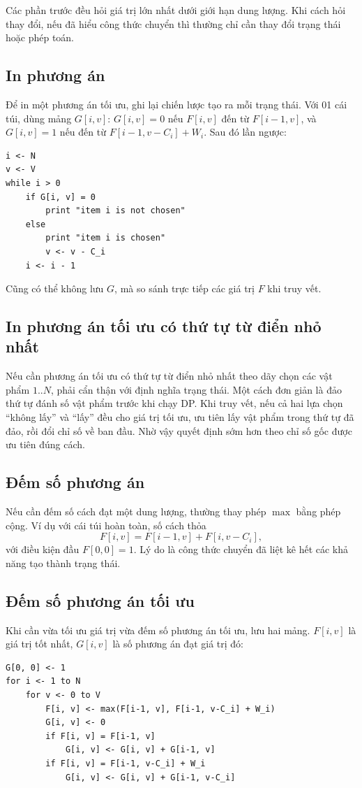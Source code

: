 \documentclass[11pt]{article}
\begin{document}
Các phần trước đều hỏi giá trị lớn nhất dưới giới hạn dung lượng. Khi cách hỏi
thay đổi, nếu đã hiểu công thức chuyển thì thường chỉ cần thay đổi trạng thái
hoặc phép toán.

\subsection{In phương án}

Để in một phương án tối ưu, ghi lại chiến lược tạo ra mỗi trạng thái. Với 01
cái túi, dùng mảng \(G[i,v]\): \(G[i,v]=0\) nếu \(F[i,v]\) đến từ
\(F[i-1,v]\), và \(G[i,v]=1\) nếu đến từ \(F[i-1,v-C_i]+W_i\). Sau đó lần
ngược:
\begin{verbatim}
i <- N
v <- V
while i > 0
    if G[i, v] = 0
        print "item i is not chosen"
    else
        print "item i is chosen"
        v <- v - C_i
    i <- i - 1
\end{verbatim}

Cũng có thể không lưu \(G\), mà so sánh trực tiếp các giá trị \(F\) khi truy
vết.

\subsection{In phương án tối ưu có thứ tự từ điển nhỏ nhất}

Nếu cần phương án tối ưu có thứ tự từ điển nhỏ nhất theo dãy chọn các vật phẩm
\(1..N\), phải cẩn thận với định nghĩa trạng thái. Một cách đơn giản là đảo
thứ tự đánh số vật phẩm trước khi chạy DP. Khi truy vết, nếu cả hai lựa chọn
``không lấy'' và ``lấy'' đều cho giá trị tối ưu, ưu tiên lấy vật phẩm trong
thứ tự đã đảo, rồi đổi chỉ số về ban đầu. Nhờ vậy quyết định sớm hơn theo chỉ
số gốc được ưu tiên đúng cách.

\subsection{Đếm số phương án}

Nếu cần đếm số cách đạt một dung lượng, thường thay phép \(\max\) bằng phép
cộng. Ví dụ với cái túi hoàn toàn, số cách thỏa
\[
  F[i,v]=F[i-1,v]+F[i,v-C_i],
\]
với điều kiện đầu \(F[0,0]=1\). Lý do là công thức chuyển đã liệt kê hết các
khả năng tạo thành trạng thái.

\subsection{Đếm số phương án tối ưu}

Khi cần vừa tối ưu giá trị vừa đếm số phương án tối ưu, lưu hai mảng. \(F[i,v]\)
là giá trị tốt nhất, \(G[i,v]\) là số phương án đạt giá trị đó:
\begin{verbatim}
G[0, 0] <- 1
for i <- 1 to N
    for v <- 0 to V
        F[i, v] <- max(F[i-1, v], F[i-1, v-C_i] + W_i)
        G[i, v] <- 0
        if F[i, v] = F[i-1, v]
            G[i, v] <- G[i, v] + G[i-1, v]
        if F[i, v] = F[i-1, v-C_i] + W_i
            G[i, v] <- G[i, v] + G[i-1, v-C_i]
\end{verbatim}
\end{document}
